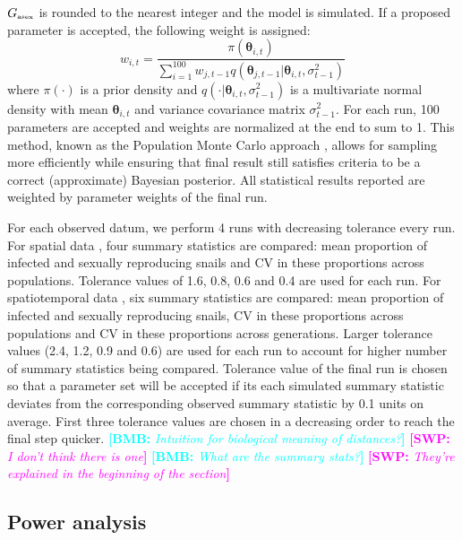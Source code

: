 \documentclass{article}\usepackage[]{graphicx}\usepackage[]{color}
\newcommand{\comment}[3]{\textcolor{#1}{\textbf{[#2: }\textit{#3}\textbf{]}}}
\newcommand{\bmb}[1]{\comment{cyan}{BMB}{#1}}
\newcommand{\swp}[1]{\comment{magenta}{SWP}{#1}}
\begin{document}
$G_{\textrm{\tiny asex}}$ is rounded to the nearest integer and the model is simulated.
If a proposed parameter is accepted, the following weight is assigned:
$$
w_{i,t} = \frac{\pi(\bm\theta_{i, t})}{\sum_{i=1}^{100} w_{j, t-1} q(\bm\theta_{j, t-1} | \bm\theta_{i,t}, \sigma_{t-1}^2)}
$$
where $\pi(\cdot)$ is a prior density and $q(\cdot | \bm\theta_{i,t}, \sigma_{t-1}^2)$ is a multivariate normal density with mean $\bm\theta_{i,t}$ and variance covariance matrix $\sigma_{t-1}^2$.
For each run, 100 parameters are accepted and weights are normalized at the end to sum to 1.
This method, known as the Population Monte Carlo approach \citep{turner2012tutorial}, allows for sampling more efficiently while ensuring that final result still satisfies criteria to be a correct (approximate) Bayesian posterior.
All statistical results reported are weighted by parameter weights of the final run.

For each observed datum, we perform 4 runs with decreasing tolerance every run.
For spatial data \citep{dagan2013clonal, mckone2016fine}, four summary statistics are compared: mean proportion of infected and sexually reproducing snails and CV in these proportions across populations.
Tolerance values of 1.6, 0.8, 0.6 and 0.4 are used for each run.
For spatiotemporal data \citep{vergara2014infection}, six summary statistics are compared: mean proportion of infected and sexually reproducing snails, CV in these proportions across populations and CV in these proportions across generations.
Larger tolerance values (2.4, 1.2, 0.9 and 0.6) are used for each run to account for higher number of summary statistics being compared.
Tolerance value of the final run is chosen so that a parameter set will be accepted if its each simulated summary statistic deviates from the corresponding observed summary statistic by 0.1 units on average.
First three tolerance values are chosen in a decreasing order to reach the final step quicker.
\bmb{Intuition for biological meaning of distances?}
\swp{I don't think there is one}
\bmb{What are the summary stats?}
\swp{They're explained in the beginning of the section}

\subsection{Power analysis}
\end{document}
